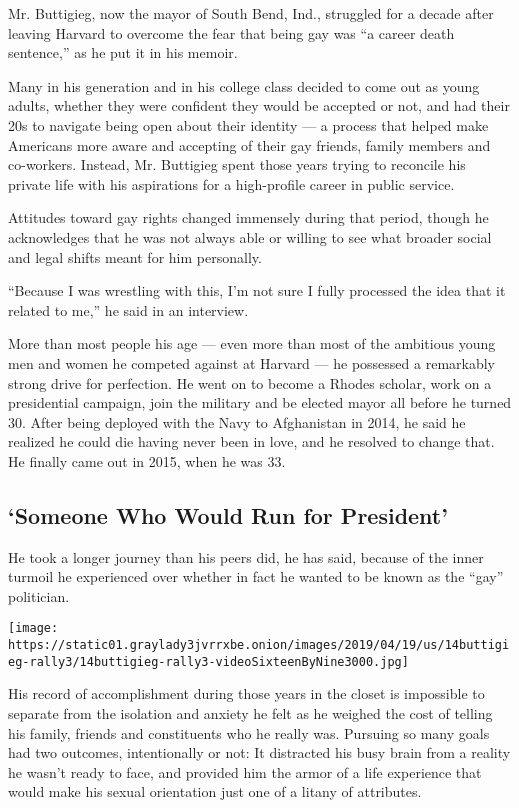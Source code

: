 Mr. Buttigieg, now the mayor of South Bend, Ind., struggled for a decade
after leaving Harvard to overcome the fear that being gay was ``a career
death sentence,'' as he put it in his memoir.

Many in his generation and in his college class decided to come out as
young adults, whether they were confident they would be accepted or not,
and had their 20s to navigate being open about their identity --- a
process that helped make Americans more aware and accepting of their gay
friends, family members and co-workers. Instead, Mr. Buttigieg spent
those years trying to reconcile his private life with his aspirations
for a high-profile career in public service.

Attitudes toward gay rights changed immensely during that period, though
he acknowledges that he was not always able or willing to see what
broader social and legal shifts meant for him personally.

``Because I was wrestling with this, I'm not sure I fully processed the
idea that it related to me,'' he said in an interview.

More than most people his age --- even more than most of the ambitious
young men and women he competed against at Harvard --- he possessed a
remarkably strong drive for perfection. He went on to become a Rhodes
scholar, work on a presidential campaign, join the military and be
elected mayor all before he turned 30. After being deployed with the
Navy to Afghanistan in 2014, he said he realized he could die having
never been in love, and he resolved to change that. He finally came out
in 2015, when he was 33.

\hypertarget{someone-who-would-run-for-president}{%
\subsection{`Someone Who Would Run for
President'}\label{someone-who-would-run-for-president}}

He took a longer journey than his peers did, he has said, because of the
inner turmoil he experienced over whether in fact he wanted to be known
as the ``gay'' politician.

\texttt{[image: https://static01.graylady3jvrrxbe.onion/images/2019/04/19/us/14buttigieg-rally3/14buttigieg-rally3-videoSixteenByNine3000.jpg]}

His record of accomplishment during those years in the closet is
impossible to separate from the isolation and anxiety he felt as he
weighed the cost of telling his family, friends and constituents who he
really was. Pursuing so many goals had two outcomes, intentionally or
not: It distracted his busy brain from a reality he wasn't ready to
face, and provided him the armor of a life experience that would make
his sexual orientation just one of a litany of attributes.

